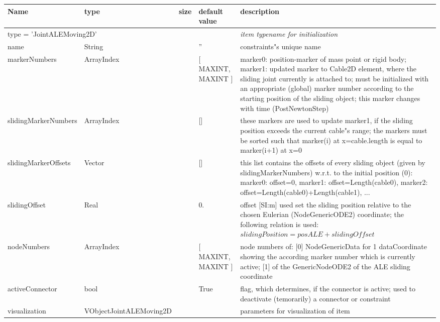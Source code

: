 \begin{center}
  \footnotesize
  \begin{longtable}{| p{4.5cm} | p{2.5cm} | p{0.5cm} | p{2.5cm} | p{6cm} |}
    \hline
    \bf Name & \bf type & \bf size & \bf default value & \bf description \\ \hline
    \multicolumn{4}{l}{\parbox{10cm}{type = 'JointALEMoving2D'}} & \multicolumn{1}{l}{\parbox{6cm}{\it item typename for initialization}}\\ \hline
    name &     String &      &     '' &     constraints"s unique name\\ \hline
    markerNumbers &     ArrayIndex &      &     [ MAXINT, MAXINT ] &     marker0: position-marker of mass point or rigid body; marker1: updated marker to Cable2D element, where the sliding joint currently is attached to; must be initialized with an appropriate (global) marker number according to the starting position of the sliding object; this marker changes with time (PostNewtonStep)\\ \hline
    slidingMarkerNumbers &     ArrayIndex &      &     [] &     these markers are used to update marker1, if the sliding position exceeds the current cable"s range; the markers must be sorted such that marker(i) at x=cable.length is equal to marker(i+1) at x=0\\ \hline
    slidingMarkerOffsets &     Vector &      &     [] &     this list contains the offsets of every sliding object (given by slidingMarkerNumbers) w.r.t. to the initial position (0): marker0: offset=0, marker1: offset=Length(cable0), marker2: offset=Length(cable0)+Length(cable1), ...\\ \hline
    slidingOffset &     Real &      &     0. &     offset [SI:m] used set the sliding position relative to the chosen Eulerian (NodeGenericODE2) coordinate; the following relation is used: $slidingPosition = posALE + slidingOffset$\\ \hline
    nodeNumbers &     ArrayIndex &      &     [ MAXINT, MAXINT ] &     node numbers of: [0] NodeGenericData for 1 dataCoordinate showing the according marker number which is currently active; [1] of the GenericNodeODE2 of the ALE sliding coordinate\\ \hline
    activeConnector &     bool &      &     True &     flag, which determines, if the connector is active; used to deactivate (temorarily) a connector or constraint\\ \hline
    visualization & VObjectJointALEMoving2D & & & parameters for visualization of item \\ \hline
	  \end{longtable}
	\end{center}
